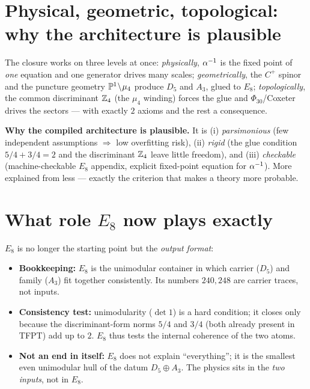 \section{Physical, geometric, topological: why the architecture is plausible}
The closure works on three levels at once: \emph{physically}, $\alpha^{-1}$ is the fixed point of \emph{one}
equation and one generator drives many scales; \emph{geometrically}, the $C^+$ spinor and the puncture
geometry $\mathbb{P}^1\!\setminus\!\mu_4$ produce $D_5$ and $A_3$, glued to $E_8$; \emph{topologically}, the
common discriminant $\mathbb{Z}_4$ (the $\mu_4$ winding) forces the glue and $\Phi_{30}$/Coxeter drives the
sectors --- with exactly $2$ axioms and the rest a consequence.

\noindent\textbf{Why the compiled architecture is plausible.}
It is (i) \emph{parsimonious} (few independent assumptions $\Rightarrow$ low overfitting risk),
(ii) \emph{rigid} (the glue condition $5/4+3/4=2$ and the discriminant $\mathbb{Z}_4$ leave little freedom),
and (iii) \emph{checkable} (machine-checkable $E_8$ appendix, explicit fixed-point equation for
$\alpha^{-1}$). More explained from less --- exactly the criterion that makes a theory more probable.

\section{What role $E_8$ now plays exactly}
$E_8$ is no longer the starting point but the \emph{output format}:
\begin{itemize}[leftmargin=1.4em]
\item \textbf{Bookkeeping:} $E_8$ is the unimodular container in which carrier ($D_5$) and family ($A_3$)
      fit together consistently. Its numbers $240,248$ are carrier traces, not inputs.
\item \textbf{Consistency test:} unimodularity ($\det 1$) is a hard condition; it closes only because the
      discriminant-form norms $5/4$ and $3/4$ (both already present in TFPT) add up to $2$. $E_8$ thus
      tests the internal coherence of the two atoms.
\item \textbf{Not an end in itself:} $E_8$ does not explain ``everything''; it is the smallest even
      unimodular hull of the datum $D_5\oplus A_3$. The physics sits in the \emph{two inputs}, not in
      $E_8$.
\end{itemize}

